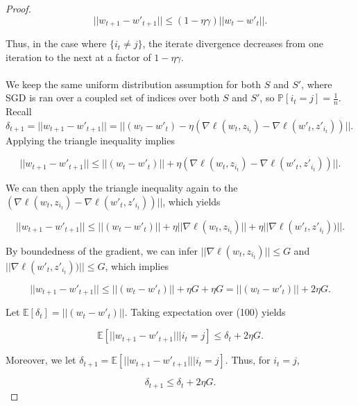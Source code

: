 \documentclass[twoside,11pt]{article}
\begin{document}
\begin{proof}
\begin{equation}
||w_{t+1} - w'_{t+1}|| \leq (1-\eta\gamma)||w_{t} - w'_{t}||.
\end{equation}

\noindent
Thus, in the case where $\{i_t \neq j\}$, the iterate divergence decreases from one iteration to the next at a factor of $1 - \eta\gamma$. \\
\\
 We keep the same uniform distribution assumption for both $S$ and $S'$, where SGD is ran over a coupled set of indices over both $S$ and $S'$, so $\mathbb{P}[i_t = j] = \frac{1}{n}$. Recall $\delta_{t+1} = ||w_{t+1} - w'_{t+1}|| = ||(w_t - w'_t) - \eta(\nabla \ell(w_t, z_{i_t}) - \nabla \ell(w'_t, z'_{i_t}))||$. Applying the triangle inequality implies

\begin{equation}
||w_{t+1} - w'_{t+1}|| \leq ||(w_t - w'_t)|| +  \eta(\nabla \ell(w_t, z_{i_t}) - \nabla \ell(w'_t, z'_{i_t}))||.
\end{equation}

\noindent
We can then apply the triangle inequality again to the $(\nabla \ell(w_t, z_{i_t}) - \nabla \ell(w'_t, z'_{i_t}))||$, which yields

\begin{equation}
||w_{t+1} - w'_{t+1}|| \leq ||(w_t - w'_t)|| +  \eta||\nabla \ell(w_t, z_{i_t})|| + \eta ||\nabla \ell(w'_t, z'_{i_t}))||.  
\end{equation}

\noindent
By boundedness of the gradient, we can infer $||\nabla \ell(w_t, z_{i_t})|| \leq G$ and $||\nabla \ell(w'_t, z'_{i_t}))|| \leq G$, which implies

\begin{equation}
||w_{t+1} - w'_{t+1}|| \leq ||(w_t - w'_t)|| +  \eta G + \eta G = ||(w_t - w'_t)|| + 2\eta G.  
\end{equation}

\noindent
Let $\mathbb{E}[\delta_t] = ||(w_t - w'_t)||$. Taking expectation over (100) yields

\begin{equation}
\mathbb{E}[||w_{t+1} - w'_{t+1}|| | i_t = j] \leq \delta_t + 2 \eta G.
\end{equation}

\noindent
Moreover, we let $\delta_{t+1} = \mathbb{E}[||w_{t+1} - w'_{t+1}|| | i_t = j]$. Thus, for $i_t = j$, 

\begin{equation}
\delta_{t+1} \leq \delta_t + 2 \eta G.
\end{equation}


\end{proof}
\end{document}
